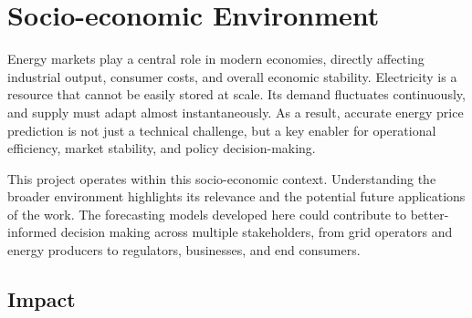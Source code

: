 \documentclass[12pt]{report} %
\begin{document}







\chapter{Socio-economic Environment}

Energy markets play a central role in modern economies, directly affecting industrial output, consumer costs, and overall economic stability. Electricity is a resource that cannot be easily stored at scale. Its demand fluctuates continuously, and supply must adapt almost instantaneously. As a result, accurate energy price prediction is not just a technical challenge, but a key enabler for operational efficiency, market stability, and policy decision-making.

This project operates within this socio-economic context. Understanding the broader environment highlights its relevance and the potential future applications of the work. The forecasting models developed here could contribute to better-informed decision making across multiple stakeholders, from grid operators and energy producers to regulators, businesses, and end consumers.


\section{Impact}
\end{document}
